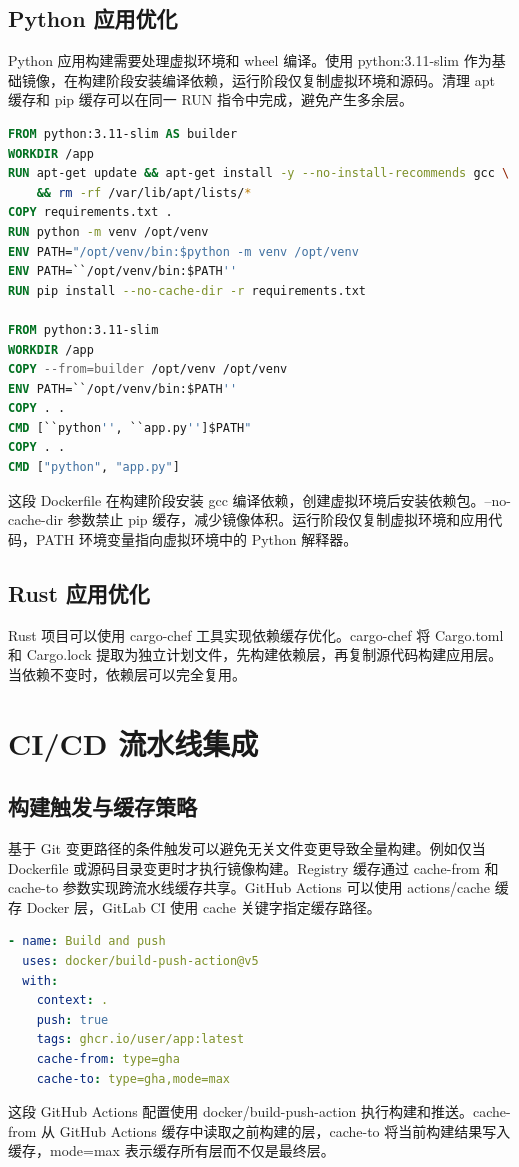 \section{Python 应用优化}
Python 应用构建需要处理虚拟环境和 wheel 编译。使用 python:3.11-slim 作为基础镜像，在构建阶段安装编译依赖，运行阶段仅复制虚拟环境和源码。清理 apt 缓存和 pip 缓存可以在同一 RUN 指令中完成，避免产生多余层。\par
\begin{lstlisting}[language=dockerfile]
FROM python:3.11-slim AS builder
WORKDIR /app
RUN apt-get update && apt-get install -y --no-install-recommends gcc \
    && rm -rf /var/lib/apt/lists/*
COPY requirements.txt .
RUN python -m venv /opt/venv
ENV PATH="/opt/venv/bin:$python -m venv /opt/venv
ENV PATH=``/opt/venv/bin:$PATH''
RUN pip install --no-cache-dir -r requirements.txt

FROM python:3.11-slim
WORKDIR /app
COPY --from=builder /opt/venv /opt/venv
ENV PATH=``/opt/venv/bin:$PATH''
COPY . .
CMD [``python'', ``app.py'']$PATH"
COPY . .
CMD ["python", "app.py"]
\end{lstlisting}
这段 Dockerfile 在构建阶段安装 gcc 编译依赖，创建虚拟环境后安装依赖包。--no-cache-dir 参数禁止 pip 缓存，减少镜像体积。运行阶段仅复制虚拟环境和应用代码，PATH 环境变量指向虚拟环境中的 Python 解释器。\par
\section{Rust 应用优化}
Rust 项目可以使用 cargo-chef 工具实现依赖缓存优化。cargo-chef 将 Cargo.toml 和 Cargo.lock 提取为独立计划文件，先构建依赖层，再复制源代码构建应用层。当依赖不变时，依赖层可以完全复用。\par
\chapter{CI/CD 流水线集成}
\section{构建触发与缓存策略}
基于 Git 变更路径的条件触发可以避免无关文件变更导致全量构建。例如仅当 Dockerfile 或源码目录变更时才执行镜像构建。Registry 缓存通过 cache-from 和 cache-to 参数实现跨流水线缓存共享。GitHub Actions 可以使用 actions/cache 缓存 Docker 层，GitLab CI 使用 cache 关键字指定缓存路径。\par
\begin{lstlisting}[language=yaml]
- name: Build and push
  uses: docker/build-push-action@v5
  with:
    context: .
    push: true
    tags: ghcr.io/user/app:latest
    cache-from: type=gha
    cache-to: type=gha,mode=max
\end{lstlisting}
这段 GitHub Actions 配置使用 docker/build-push-action 执行构建和推送。cache-from 从 GitHub Actions 缓存中读取之前构建的层，cache-to 将当前构建结果写入缓存，mode=max 表示缓存所有层而不仅是最终层。\par

